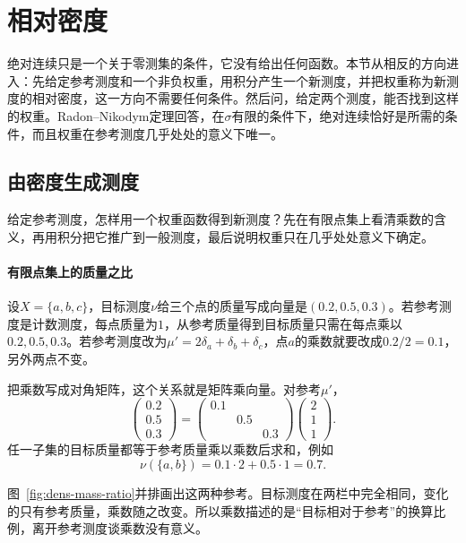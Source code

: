 \section{相对密度}
\label{sec:dens-relative-density}

绝对连续只是一个关于零测集的条件，它没有给出任何函数。本节从相反的方向进入：先给定参考测度和一个非负权重，用积分产生一个新测度，并把权重称为新测度的相对密度，这一方向不需要任何条件。然后问，给定两个测度，能否找到这样的权重。Radon–Nikodym定理回答，在$\sigma$有限的条件下，绝对连续恰好是所需的条件，而且权重在参考测度几乎处处的意义下唯一。

\subsection{由密度生成测度}
\label{sec:dens-weighted-measure}

给定参考测度，怎样用一个权重函数得到新测度？先在有限点集上看清乘数的含义，再用积分把它推广到一般测度，最后说明权重只在几乎处处意义下确定。

\paragraph{有限点集上的质量之比}
设$X=\{a,b,c\}$，目标测度$\nu$给三个点的质量写成向量是$(0.2,0.5,0.3)$。若参考测度是计数测度，每点质量为$1$，从参考质量得到目标质量只需在每点乘以$0.2,0.5,0.3$。若参考测度改为$\mu'=2\delta_a+\delta_b+\delta_c$，点$a$的乘数就要改成$0.2/2=0.1$，另外两点不变。

把乘数写成对角矩阵，这个关系就是矩阵乘向量。对参考$\mu'$，
\[
\begin{pmatrix}0.2\\0.5\\0.3\end{pmatrix}
=\begin{pmatrix}0.1&&\\&0.5&\\&&0.3\end{pmatrix}
\begin{pmatrix}2\\1\\1\end{pmatrix}.
\]
任一子集的目标质量都等于参考质量乘以乘数后求和，例如
\[
\nu(\{a,b\})=0.1\cdot2+0.5\cdot1=0.7 .
\]

图~\ref{fig:dens-mass-ratio}并排画出这两种参考。目标测度在两栏中完全相同，变化的只有参考质量，乘数随之改变。所以乘数描述的是“目标相对于参考”的换算比例，离开参考测度谈乘数没有意义。

